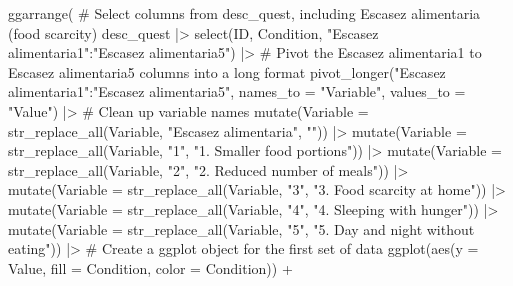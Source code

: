 \documentclass[
  bookmarksnumbered]{article}
\newenvironment{Shaded}{\begin{snugshade}}{\end{snugshade}}
\newcommand{\AttributeTok}[1]{\textcolor[rgb]{0.80,0.80,0.80}{#1}}
\newcommand{\CommentTok}[1]{\textcolor[rgb]{0.50,0.62,0.50}{#1}}
\newcommand{\FunctionTok}[1]{\textcolor[rgb]{0.94,0.94,0.56}{#1}}
\newcommand{\NormalTok}[1]{\textcolor[rgb]{0.80,0.80,0.80}{#1}}
\newcommand{\SpecialCharTok}[1]{\textcolor[rgb]{0.86,0.64,0.64}{#1}}
\newcommand{\StringTok}[1]{\textcolor[rgb]{0.80,0.58,0.58}{#1}}
\begin{document}
\begin{Shaded}
\begin{Highlighting}[]
\FunctionTok{ggarrange}\NormalTok{(}
  \CommentTok{\# Select columns from desc\_quest, including \textquotesingle{}Escasez alimentaria\textquotesingle{} (food scarcity)}
\NormalTok{  desc\_quest }\SpecialCharTok{|\textgreater{}}
    \FunctionTok{select}\NormalTok{(ID, Condition, }\StringTok{"Escasez alimentaria1"}\SpecialCharTok{:}\StringTok{"Escasez alimentaria5"}\NormalTok{) }\SpecialCharTok{|\textgreater{}}
    \CommentTok{\# Pivot the Escasez alimentaria1 to Escasez alimentaria5 columns into a long format}
    \FunctionTok{pivot\_longer}\NormalTok{(}\StringTok{"Escasez alimentaria1"}\SpecialCharTok{:}\StringTok{"Escasez alimentaria5"}\NormalTok{,}
                 \AttributeTok{names\_to =} \StringTok{"Variable"}\NormalTok{,}
                 \AttributeTok{values\_to =} \StringTok{"Value"}\NormalTok{) }\SpecialCharTok{|\textgreater{}}
    \CommentTok{\# Clean up variable names}
    \FunctionTok{mutate}\NormalTok{(}\AttributeTok{Variable =} \FunctionTok{str\_replace\_all}\NormalTok{(Variable, }\StringTok{"Escasez alimentaria"}\NormalTok{, }\StringTok{""}\NormalTok{)) }\SpecialCharTok{|\textgreater{}}
    \FunctionTok{mutate}\NormalTok{(}\AttributeTok{Variable =} \FunctionTok{str\_replace\_all}\NormalTok{(Variable, }\StringTok{"1"}\NormalTok{, }\StringTok{"1. Smaller food portions"}\NormalTok{)) }\SpecialCharTok{|\textgreater{}}
    \FunctionTok{mutate}\NormalTok{(}\AttributeTok{Variable =} \FunctionTok{str\_replace\_all}\NormalTok{(Variable, }\StringTok{"2"}\NormalTok{, }\StringTok{"2. Reduced number of meals"}\NormalTok{)) }\SpecialCharTok{|\textgreater{}}
    \FunctionTok{mutate}\NormalTok{(}\AttributeTok{Variable =} \FunctionTok{str\_replace\_all}\NormalTok{(Variable, }\StringTok{"3"}\NormalTok{, }\StringTok{"3. Food scarcity at home"}\NormalTok{)) }\SpecialCharTok{|\textgreater{}}
    \FunctionTok{mutate}\NormalTok{(}\AttributeTok{Variable =} \FunctionTok{str\_replace\_all}\NormalTok{(Variable, }\StringTok{"4"}\NormalTok{, }\StringTok{"4. Sleeping with hunger"}\NormalTok{)) }\SpecialCharTok{|\textgreater{}}
    \FunctionTok{mutate}\NormalTok{(}\AttributeTok{Variable =} \FunctionTok{str\_replace\_all}\NormalTok{(Variable, }\StringTok{"5"}\NormalTok{, }\StringTok{"5. Day and night without eating"}\NormalTok{)) }\SpecialCharTok{|\textgreater{}}
    \CommentTok{\# Create a ggplot object for the first set of data}
    \FunctionTok{ggplot}\NormalTok{(}\FunctionTok{aes}\NormalTok{(}\AttributeTok{y =}\NormalTok{ Value, }\AttributeTok{fill =}\NormalTok{ Condition, }\AttributeTok{color =}\NormalTok{ Condition)) }\SpecialCharTok{+}

\end{Highlighting}
\end{Shaded}
\end{document}
